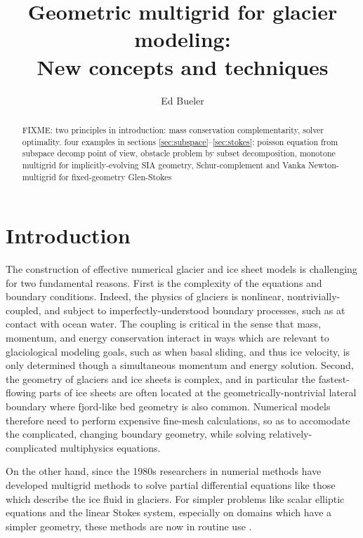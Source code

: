\documentclass[letterpaper,final,12pt,reqno]{amsart}
\numberwithin{equation}{section}
\numberwithin{figure}{section}
\numberwithin{table}{section}
\begin{document}
\title[Geometric multigrid for glacier modeling]{Geometric multigrid for glacier modeling: \\ New concepts and techniques}

\author{Ed Bueler}

\begin{abstract} FIXME: two principles in introduction: mass conservation complementarity, solver optimality.  four examples in sections \ref{sec:subspace}--\ref{sec:stokes}: poisson equation from subspace decomp point of view, obstacle problem by subset decomposition, monotone multigrid for implicitly-evolving SIA geometry, Schur-complement and Vanka Newton-multigrid for fixed-geometry Glen-Stokes
\end{abstract}

\maketitle

\tableofcontents

\thispagestyle{empty}
\bigskip

\section{Introduction} \label{sec:intro}

The construction of effective numerical glacier and ice sheet models is challenging for two fundamental reasons.  First is the complexity of the equations and boundary conditions.  Indeed, the physics of glaciers is nonlinear, nontrivially-coupled, and subject to imperfectly-understood boundary processes, such as at contact with ocean water.  The coupling is critical in the sense that mass, momentum, and energy conservation interact in ways which are relevant to glaciological modeling goals, such as when basal sliding, and thus ice velocity, is only determined though a simultaneous momentum and energy solution.  Second, the geometry of glaciers and ice sheets is complex, and in particular the fastest-flowing parts of ice sheets are often located at the geometrically-nontrivial lateral boundary where fjord-like bed geometry is also common.  Numerical models therefore need to perform expensive fine-mesh calculations, so as to accomodate the complicated, changing boundary geometry, while solving relatively-complicated multiphysics equations.

On the other hand, since the 1980s researchers in numerial methods have developed multigrid methods to solve partial differential equations like those which describe the ice fluid in glaciers.   For simpler problems like scalar elliptic equations and the linear Stokes system, especially on domains which have a simpler geometry, these methods are now in routine use \cite{Briggsetal2000,Bueler2021,Trottenbergetal2001}.
\end{document}
